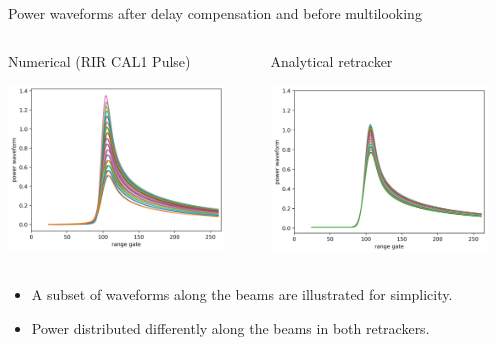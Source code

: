 \documentclass[compress,8pt]{beamer}
\begin{document}
\begin{frame}{Power waveforms after delay compensation and before multilooking}
 
 
 \begin{columns}
\begin{column}{0.45\textwidth}\centering

Numerical (RIR CAL1 Pulse)

  \includegraphics[width=0.9\textwidth]{fig/waveforms_dc_num_PTRnum}

\end{column}
\begin{column}{0.45\textwidth}\centering

Analytical retracker

\includegraphics[width=0.9\textwidth]{fig/waveforms_dc_ana_PTRana} 
  
\end{column}
\end{columns}

\vspace{1cm}
\begin{itemize}
 \item A subset of waveforms along the beams are illustrated for simplicity.
 \item Power distributed differently along the beams in both retrackers.
\end{itemize}

\end{frame}
\end{document}
